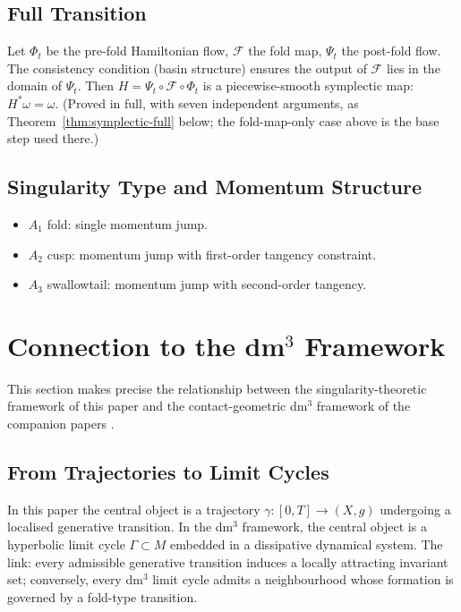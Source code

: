 \documentclass[14pt,a4paper]{extarticle}
\begin{document}
\subsection{Full Transition}

Let $\Phi_t$ be the pre-fold Hamiltonian flow, $\mathcal{F}$ the fold
map, $\Psi_t$ the post-fold flow.
The consistency condition (basin structure) ensures the output of
$\mathcal{F}$ lies in the domain of $\Psi_t$.
Then $H = \Psi_t \circ \mathcal{F} \circ \Phi_t$ is a
piecewise-smooth symplectic map: $H^*\omega = \omega$. (Proved in full,
with seven independent arguments, as Theorem~\ref{thm:symplectic-full}
below; the fold-map-only case above is the base step used there.)

\subsection{Singularity Type and Momentum Structure}

\begin{itemize}[leftmargin=2em]
  \item $A_1$ fold: single momentum jump.
  \item $A_2$ cusp: momentum jump with first-order tangency constraint.
  \item $A_3$ swallowtail: momentum jump with second-order tangency.
\end{itemize}

\section{Connection to the dm$^3$ Framework}
\label{sec:gcm}

This section makes precise the relationship between the
singularity-theoretic framework of this paper and the
contact-geometric dm$^3$ framework of the companion papers
\cite{Grossi2026_SIAM, Grossi2026_ChA}.

\subsection{From Trajectories to Limit Cycles}

In this paper the central object is a trajectory
$\gamma : [0,T] \to (X,g)$ undergoing a localised generative
transition.
In the dm$^3$ framework, the central object is a hyperbolic limit cycle
$\Gamma \subset M$ embedded in a dissipative dynamical system.
The link: every admissible generative transition induces a locally
attracting invariant set; conversely, every dm$^3$ limit cycle admits
a neighbourhood whose formation is governed by a fold-type transition.
\end{document}
